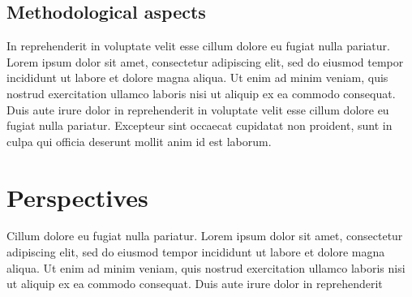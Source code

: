 \subsection {Methodological aspects} In reprehenderit in voluptate velit esse cillum dolore eu fugiat nulla pariatur. Lorem ipsum dolor sit amet, consectetur adipiscing elit, sed do eiusmod tempor incididunt ut labore et dolore magna aliqua. Ut enim ad minim veniam, quis nostrud exercitation ullamco laboris nisi ut aliquip ex ea commodo consequat. Duis aute irure dolor in reprehenderit in voluptate velit esse cillum dolore eu fugiat nulla pariatur. Excepteur sint occaecat cupidatat non proident, sunt in culpa qui officia deserunt mollit anim id est laborum.



\section{Perspectives} Cillum dolore eu fugiat nulla pariatur. Lorem ipsum dolor sit amet, consectetur adipiscing elit, sed do eiusmod tempor incididunt ut labore et dolore magna aliqua. Ut enim ad minim veniam, quis nostrud exercitation ullamco laboris nisi ut aliquip ex ea commodo consequat. Duis aute irure dolor in reprehenderit
